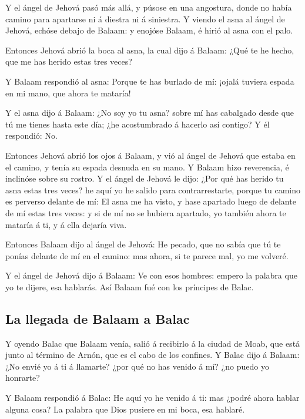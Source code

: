  Y el ángel de Jehová pasó más allá, y púsose en una
angostura, donde no había camino para apartarse ni á diestra ni á
siniestra.  Y viendo el asna al ángel de Jehová, echóse
debajo de Balaam: y enojóse Balaam, é hirió al asna con el palo.

 Entonces Jehová abrió la boca al asna, la cual dijo á
Balaam: ¿Qué te he hecho, que me has herido estas tres veces?

 Y Balaam respondió al asna: Porque te has burlado de mí:
¡ojalá tuviera espada en mi mano, que ahora te mataría!

 Y el asna dijo á Balaam: ¿No soy yo tu asna? sobre mí
has cabalgado desde que tú me tienes hasta este día; ¿he acostumbrado á
hacerlo así contigo? Y él respondió: No.

 Entonces Jehová abrió los ojos á Balaam, y vió al ángel
de Jehová que estaba en el camino, y tenía su espada desnuda en su mano.
Y Balaam hizo reverencia, é inclinóse sobre su rostro.  Y
el ángel de Jehová le dijo: ¿Por qué has herido tu asna estas tres
veces? he aquí yo he salido para contrarrestarte, porque tu camino es
perverso delante de mí:  El asna me ha visto, y hase
apartado luego de delante de mí estas tres veces: y si de mí no se
hubiera apartado, yo también ahora te mataría á ti, y á ella dejaría
viva.

 Entonces Balaam dijo al ángel de Jehová: He pecado, que
no sabía que tú te ponías delante de mí en el camino: mas ahora, si te
parece mal, yo me volveré.

 Y el ángel de Jehová dijo á Balaam: Ve con esos hombres:
empero la palabra que yo te dijere, esa hablarás. Así Balaam fué con los
príncipes de Balac.

\hypertarget{la-llegada-de-balaam-a-balac}{%
\subsection{La llegada de Balaam a
Balac}\label{la-llegada-de-balaam-a-balac}}

 Y oyendo Balac que Balaam venía, salió á recibirlo á la
ciudad de Moab, que está junto al término de Arnón, que es el cabo de
los confines.  Y Balac dijo á Balaam: ¿No envié yo á ti á
llamarte? ¿por qué no has venido á mí? ¿no puedo yo honrarte?

 Y Balaam respondió á Balac: He aquí yo he venido á ti:
mas ¿podré ahora hablar alguna cosa? La palabra que Dios pusiere en mi
boca, esa hablaré.

